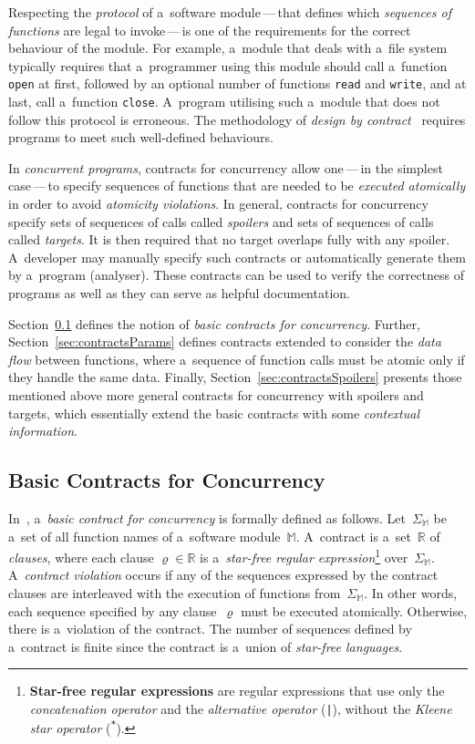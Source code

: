 Respecting the \emph{protocol} of a~software module\,---\,that defines which \emph{sequences of functions} are legal to invoke\,---\,is one of the requirements for the correct behaviour of the module. For example, a~module that deals with a~file system typically requires that a~programmer using this module should call a~function \texttt{open} at first, followed by an optional number of functions \texttt{read} and \texttt{write}, and at last, call a~function \texttt{close}. A~program utilising such a~module that does not follow this protocol is erroneous. The methodology of \emph{design by contract}~\cite{contract} requires programs to meet such well-defined behaviours.~\cite{contracts2015}

In \emph{concurrent programs}, contracts for concurrency allow one\,---\,in the simplest case\,---\,to specify sequences of functions that are needed to be \emph{executed atomically} in order to avoid \emph{atomicity violations}. In general, contracts for concurrency specify sets of sequences of calls called \emph{spoilers} and sets of sequences of calls called \emph{targets}. It is then required that no target overlaps fully with any spoiler. A~developer may manually specify such contracts or automatically generate them by a~program (analyser). These contracts can be used to verify the correctness of programs as well as they can serve as helpful documentation.

Section~\ref{sec:contractsBasic} defines the notion of \emph{basic contracts for concurrency}. Further, Section~\ref{sec:contractsParams} defines contracts extended to consider the \emph{data flow} between functions, where a~sequence of function calls must be atomic only if they handle the same data. Finally, Section~\ref{sec:contractsSpoilers} presents those mentioned above more general contracts for concurrency with spoilers and targets, which essentially extend the basic contracts with some \emph{contextual information}.

\subsection{Basic Contracts for Concurrency}
\label{sec:contractsBasic}

In~\cite{contracts2017, contracts2015}, a~\emph{basic contract for concurrency} is formally defined as follows. Let~$ \Sigma_\mathbb{M} $ be a~set of all function names of a~software module~$ \mathbb{M} $. A~contract is a~set~$ \mathbb{R} $ of \emph{clauses}, where each clause $ \varrho \in \mathbb{R} $ is a~\emph{star-free regular expression}\footnote{\textbf{Star-free regular expressions} are regular expressions that use only the \emph{concatenation operator} and the \emph{alternative operator} (\texttt{|}), without the \emph{Kleene star operator} (\texttt{\textsuperscript{*}}).} over~$ \Sigma_\mathbb{M} $. A~\emph{contract violation} occurs if any of the sequences expressed by the contract clauses are interleaved with the execution of functions from~$ \Sigma_\mathbb{M} $. In other words, each sequence specified by any clause~$ \varrho $ must be executed atomically. Otherwise, there is a~violation of the contract. The number of sequences defined by a~contract is finite since the contract is a~union of \emph{star-free languages}.

